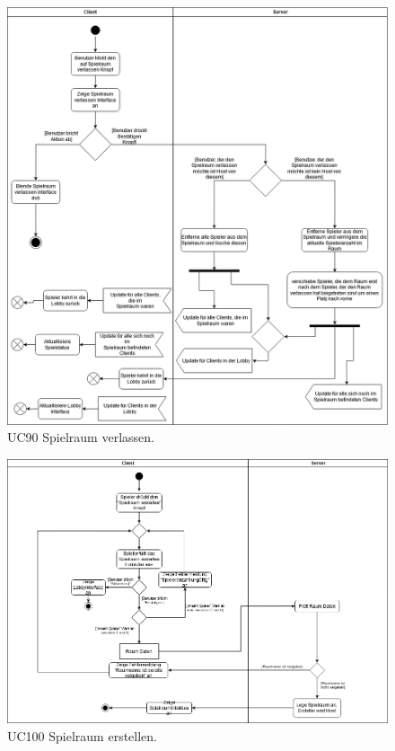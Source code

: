 \begin{figure}[h]
	\centering
	\includegraphics[width=\textwidth]{ad/UC90_Raum verlassen_v3.png}
	\caption{UC90 Spielraum verlassen.}
\end{figure}

\begin{figure}[h]
	\centering
	\includegraphics[width=\textwidth]{ad/UC100_Spielraum erstellen.png}
	\caption{UC100 Spielraum erstellen.}
\end{figure}

